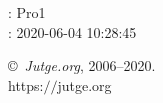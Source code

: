 \documentclass[11pt]{article}
\begin{document}
    \newcommand{\SampleTwoCol}{\SampleTwoColInputOutput{sample-000}{}}
    \newcommand{\SampleOneCol}{\SampleOneColInputOutput{sample-000}{}}

    \ProblemInformation
    \Author: Pro1\\    
    \Generation: 2020-06-04 10:28:45

    \bigskip

    \copyright\ \emph{Jutge.org}, 2006--2020. \\
    https:$/\!\!/$jutge.org
\end{document}
